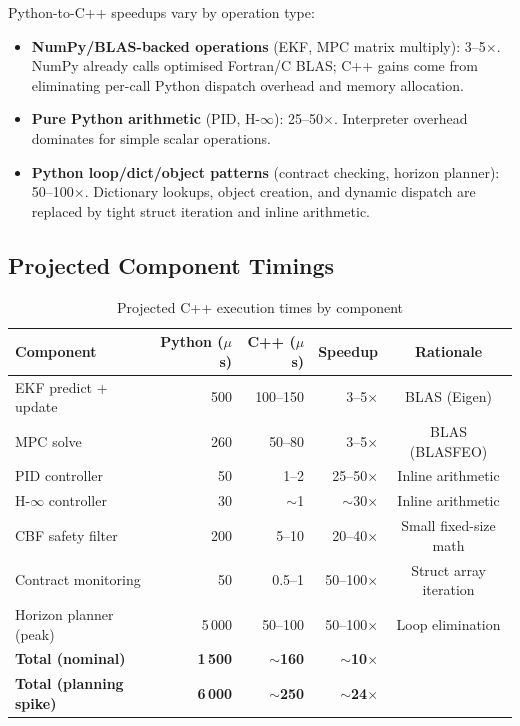 Python-to-C++ speedups vary by operation type:

\begin{itemize}
    \item \textbf{NumPy/BLAS-backed operations} (EKF, MPC matrix multiply): 3--5$\times$. NumPy already calls optimised Fortran/C BLAS; C++ gains come from eliminating per-call Python dispatch overhead and memory allocation.
    \item \textbf{Pure Python arithmetic} (PID, H-$\infty$): 25--50$\times$. Interpreter overhead dominates for simple scalar operations.
    \item \textbf{Python loop/dict/object patterns} (contract checking, horizon planner): 50--100$\times$. Dictionary lookups, object creation, and dynamic dispatch are replaced by tight struct iteration and inline arithmetic.
\end{itemize}

\subsection{Projected Component Timings}

\begin{table}[htbp]
    \centering
    \caption{Projected C++ execution times by component}
    \label{tab:cpp_projection}
    \begin{tabular}{@{}lrrrc@{}}
        \toprule
        \textbf{Component} & \textbf{Python ($\mu$s)} & \textbf{C++ ($\mu$s)} & \textbf{Speedup} & \textbf{Rationale} \\
        \midrule
        EKF predict + update & 500 & 100--150 & 3--5$\times$ & BLAS (Eigen) \\
        MPC solve & 260 & 50--80 & 3--5$\times$ & BLAS (BLASFEO) \\
        PID controller & 50 & 1--2 & 25--50$\times$ & Inline arithmetic \\
        H-$\infty$ controller & 30 & $\sim$1 & $\sim$30$\times$ & Inline arithmetic \\
        CBF safety filter & 200 & 5--10 & 20--40$\times$ & Small fixed-size math \\
        Contract monitoring & 50 & 0.5--1 & 50--100$\times$ & Struct array iteration \\
        Horizon planner (peak) & 5\,000 & 50--100 & 50--100$\times$ & Loop elimination \\
        \midrule
        \textbf{Total (nominal)} & \textbf{1\,500} & \textbf{$\sim$160} & \textbf{$\sim$10$\times$} & \\
        \textbf{Total (planning spike)} & \textbf{6\,000} & \textbf{$\sim$250} & \textbf{$\sim$24$\times$} & \\
        \bottomrule
    \end{tabular}
\end{table}


